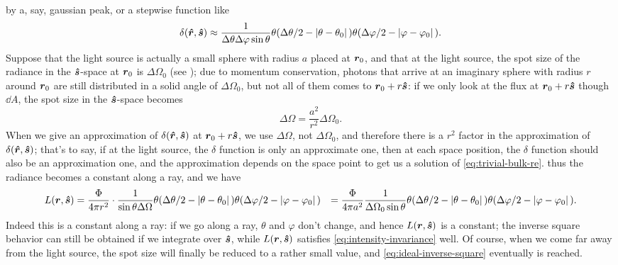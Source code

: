 \documentclass[hyperref, a4paper]{article}
\def\\{}%
\begin{document}
by a, say, gaussian peak, or a stepwise function like 
\begin{equation}
    \delta(\vu*{r}, \vu*{s}) \approx \frac{1}{\Delta \theta \Delta \varphi \sin \theta} 
    \theta(\Delta \theta / 2 - \abs*{\theta - \theta_0})
    \theta(\Delta \varphi / 2 - \abs*{\varphi - \varphi_0}) .
\end{equation}
Suppose that the light source is actually a small sphere with radius $a$
placed at $\vb*{r}_0$,
and that at the light source, 
the spot size of the radiance in the $\vu*{s}$-space at $\vb*{r}_0$ is $\Delta \Omega_0$
(see );
due to momentum conservation, 
photons that arrive at an imaginary sphere with radius $r$ around $\vb*{r}_0$ 
are still distributed in a solid angle of $\Delta \Omega_0$, 
but not all of them comes to $\vb*{r}_0 + r \vu*{s} $: 
if we only look at the flux at $\vb*{r}_0 + r \vu*{s}$
though $\dd{A}$, 
the spot size in the $\vu*{s}$-space becomes 
\begin{equation}
    \Delta \Omega = \frac{a^2}{r^2} \Delta \Omega_0.
\end{equation} 
When we give an approximation of $\delta(\vu*{r}, \vu*{s})$ at $\vb*{r}_0 + r \vu*{s}$,
we use $\Delta \Omega$, not $\Delta \Omega_0$,
and therefore there is a $r^2$ factor in the approximation of $\delta(\vu*{r}, \vu*{s})$;
that's to say, 
if at the light source, the $\delta$ function is only an approximate one, 
then at each space position, 
the $\delta$ function should also be an approximation one, 
and the approximation depends on the space point 
to get us a solution of \eqref{eq:trivial-bulk-re}.
thus the radiance becomes a constant along a ray, 
and we have 
\begin{equation}
    \begin{aligned}
        L(\vb*{r}, \vu*{s}) &= \frac{\Phi}{4 \pi r^2} \cdot \frac{1}{\sin \theta \Delta \Omega} 
        \theta(\Delta \theta / 2 - \abs*{\theta - \theta_0})
        \theta(\Delta \varphi / 2 - \abs*{\varphi - \varphi_0})  \\
        &= \frac{\Phi}{4 \pi a^2} \frac{1}{\Delta \Omega_0 \sin \theta} 
        \theta(\Delta \theta / 2 - \abs*{\theta - \theta_0})
        \theta(\Delta \varphi / 2 - \abs*{\varphi - \varphi_0}) .
    \end{aligned}
\end{equation}
Indeed this is a constant along a ray: 
if we go along a ray, $\theta$ and $\varphi$ don't change, 
and hence $L(\vb*{r}, \vu*{s})$ is a constant; 
the inverse square behavior can still be obtained if we integrate over $\vu*{s}$,
while $L(\vb*{r}, \vu*{s})$ satisfies \eqref{eq:intensity-invariance} well.
Of course, when we come far away from the light source, 
the spot size will finally be reduced to a rather small value, 
and \eqref{eq:ideal-inverse-square} eventually is reached.
\end{document}
